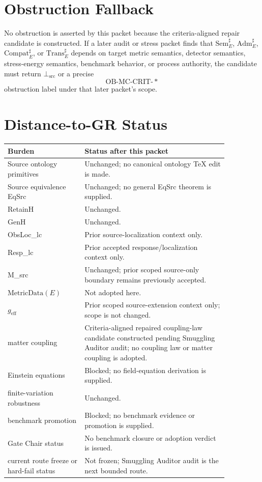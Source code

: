 \documentclass[11pt]{article}
\newcommand{\geff}{g_{\mathrm{eff}}}
\newcommand{\MetricData}{\mathrm{MetricData}}
\newcommand{\BottomSrc}{\bot_{\mathrm{src}}}
\newcommand{\Sem}{\mathrm{Sem}}
\newcommand{\Adm}{\mathrm{Adm}}
\newcommand{\Trans}{\mathrm{Trans}}
\newcommand{\Compat}{\mathrm{Compat}}
\newcommand{\OBMC}{\mathrm{OB}\mbox{-}\mathrm{MC}}
\begin{document}
\section{Obstruction Fallback}

No obstruction is asserted by this packet because the criteria-aligned repair
candidate is constructed. If a later audit or stress packet finds that
\(\Sem_E^{\sharp}\), \(\Adm_E^{\sharp}\), \(\Compat_E^{\sharp}\), or
\(\Trans_E^{\sharp}\) depends on target metric semantics, detector semantics,
stress-energy semantics, benchmark behavior, or process authority, the
candidate must return \(\BottomSrc\) or a precise
\[
  \OBMC\mbox{-}\mathrm{CRIT}\mbox{-}\ast
\]
obstruction label under that later packet's scope.

\section{Distance-to-GR Status}

\begin{longtable}{p{0.30\linewidth}p{0.56\linewidth}}
\toprule
Burden & Status after this packet \\
\midrule
Source ontology primitives & Unchanged; no canonical ontology TeX edit is made. \\
Source equivalence EqSrc & Unchanged; no general EqSrc theorem is supplied. \\
RetainH & Unchanged. \\
GenH & Unchanged. \\
ObsLoc\_lc & Prior source-localization context only. \\
Resp\_lc & Prior accepted response/localization context only. \\
M\_src & Unchanged; prior scoped source-only boundary remains previously accepted. \\
\(\MetricData(E)\) & Not adopted here. \\
\(\geff\) & Prior scoped source-extension context only; scope is not changed. \\
matter coupling & Criteria-aligned repaired coupling-law candidate constructed pending Smuggling Auditor audit; no coupling law or matter coupling is adopted. \\
Einstein equations & Blocked; no field-equation derivation is supplied. \\
finite-variation robustness & Unchanged. \\
benchmark promotion & Blocked; no benchmark evidence or promotion is supplied. \\
Gate Chair status & No benchmark closure or adoption verdict is issued. \\
current route freeze or hard-fail status & Not frozen; Smuggling Auditor audit is the next bounded route. \\
\bottomrule
\end{longtable}
\end{document}
